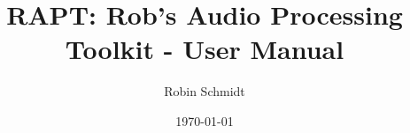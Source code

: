 \documentclass[11pt,a4paper]{report}
\begin{document}
  \title{RAPT: Rob's Audio Processing Toolkit - User Manual}
  \author{Robin Schmidt}
  \date{\today}
  \maketitle

  

	
\end{document}
